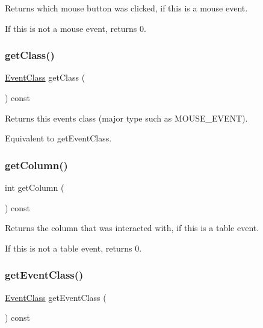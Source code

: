 Returns which mouse button was clicked, if this is a mouse event. 

If this is not a mouse event, returns 0. \mbox{\label{classsgl_1_1GEvent_a389eadf538a5311effff6a08d0426b34}} 
\subsubsection{\texorpdfstring{get\+Class()}{getClass()}}
{\footnotesize\ttfamily \mbox{\hyperlink{namespacesgl_a6ff6e8ee75a08092e30167b2b7c5d6f7}{Event\+Class}} get\+Class (\begin{DoxyParamCaption}{ }\end{DoxyParamCaption}) const\hspace{0.3cm}{\ttfamily [virtual]}}



Returns this event\textquotesingle{}s class (major type such as M\+O\+U\+S\+E\+\_\+\+E\+V\+E\+NT). 

Equivalent to get\+Event\+Class. \mbox{\label{classsgl_1_1GEvent_a36cb86612277798a9adb168403386280}} 
\subsubsection{\texorpdfstring{get\+Column()}{getColumn()}}
{\footnotesize\ttfamily int get\+Column (\begin{DoxyParamCaption}{ }\end{DoxyParamCaption}) const\hspace{0.3cm}{\ttfamily [virtual]}}



Returns the column that was interacted with, if this is a table event. 

If this is not a table event, returns 0. \mbox{\label{classsgl_1_1GEvent_a84e9319971c682404ea8f030cfee38f9}} 
\subsubsection{\texorpdfstring{get\+Event\+Class()}{getEventClass()}}
{\footnotesize\ttfamily \mbox{\hyperlink{namespacesgl_a6ff6e8ee75a08092e30167b2b7c5d6f7}{Event\+Class}} get\+Event\+Class (\begin{DoxyParamCaption}{ }\end{DoxyParamCaption}) const\hspace{0.3cm}{\ttfamily [virtual]}}



